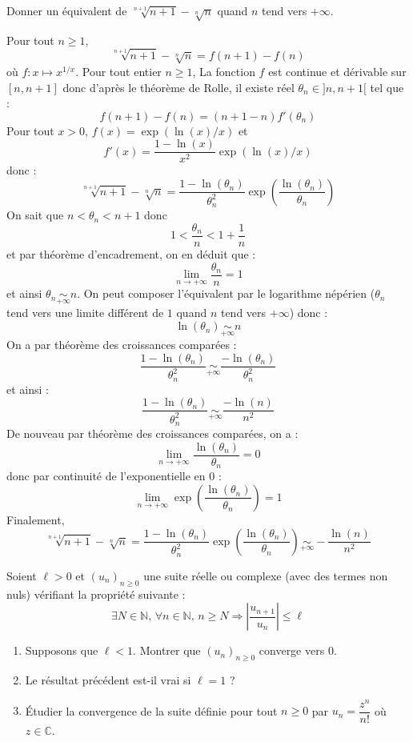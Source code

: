 \documentclass[a4paper,10pt]{report}
\begin{document}
\begin{Exa} Donner un équivalent de $\sqrt[n+1]{n+1} - \sqrt[n]{n}$ quand $n$ tend vers $+ \infty$.
\end{Exa} 

\corr Pour tout $n \geq 1$,
$$ \sqrt[n+1]{n+1} - \sqrt[n]{n} = f(n+1)-f(n)$$
où $f : x \mapsto x^{1/x}$. Pour tout entier $n \geq 1$, La fonction $f$ est continue et dérivable sur $[n,n+1]$ donc d'après le théorème de Rolle, il existe réel $\theta_n \in ]n,n+1[$ tel que :
$$ f(n+1)-f(n) = (n+1-n) f'(\theta_n)$$
Pour tout $x>0$, $f(x)=\exp (\ln(x)/x)$ et 
$$ f'(x) = \dfrac{1-\ln(x)}{x^2} \exp(\ln(x)/x)$$
donc :
$$ \sqrt[n+1]{n+1} - \sqrt[n]{n} = \dfrac{1-\ln(\theta_n)}{\theta_n^2} \exp \left( \dfrac{\ln(\theta_n)}{\theta_n} \right)$$
On sait que $n< \theta_n < n+1$ donc 
$$ 1 < \dfrac{\theta_n}{n} < 1+ \dfrac{1}{n}$$
et par théorème d'encadrement, on en déduit que :
$$ \lim_{n \rightarrow + \infty} \dfrac{\theta_n}{n} = 1$$
et ainsi $\theta_n \underset{+ \infty}{\sim} n$. On peut composer l'équivalent par le logarithme népérien ($\theta_n$ tend vers une limite différent de $1$ quand $n$ tend vers $+ \infty$) donc :
$$ \ln(\theta_n) \underset{+ \infty}{\sim} n$$
On a par théorème des croissances comparées :
$$ \dfrac{1-\ln(\theta_n)}{\theta_n^2} \underset{+ \infty}{\sim}  \dfrac{-\ln(\theta_n)}{\theta_n^2}$$
et ainsi :
$$  \dfrac{1-\ln(\theta_n)}{\theta_n^2} \underset{+ \infty}{\sim}  \dfrac{-\ln(n)}{n^2}$$
De nouveau par théorème des croissances comparées, on a :
$$ \lim_{n \rightarrow + \infty} \dfrac{\ln(\theta_n)}{\theta_n} = 0$$
donc par continuité de l'exponentielle en $0$ :
$$  \lim_{n \rightarrow + \infty} \exp \left( \dfrac{\ln(\theta_n)}{\theta_n} \right) =1$$
Finalement,
$$  \sqrt[n+1]{n+1} - \sqrt[n]{n} = \dfrac{1-\ln(\theta_n)}{\theta_n^2} \exp \left( \dfrac{\ln(\theta_n)}{\theta_n} \right) \underset{+ \infty}{\sim} - \dfrac{\ln(n)}{n^2}$$

%
%
%

\begin{Exa} Soient $\ell>0$ et $(u_n)_{n \geq 0}$ une suite réelle ou complexe (avec des termes non nuls) vérifiant la propriété suivante :
$$\exists N \in \mathbb{N}, \, \forall n \in \mathbb{N}, \, n \geq N \Longrightarrow \left\vert \frac{u_{n+1}}{u_n} \right\vert   \leq \ell$$

\begin{enumerate}
\item Supposons que $\ell<1$. Montrer que $(u_n)_{n \geq 0}$ converge vers $0$.
\item Le résultat précédent est-il vrai si $\ell = 1$ ?
\item Étudier la convergence de la suite définie pour tout $n \geq 0$ par $u_n = \dfrac{z^n}{n!}$ où $z \in \mathbb{C}$.
\end{enumerate}
\end{Exa}
\end{document}
